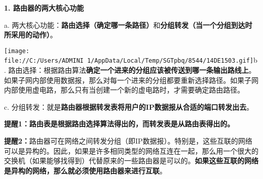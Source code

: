 {\textbf{1. 路由器的两大核心功能}}

{a.
两大核心功能：}\textbf{路由选择（确定哪一条路径）}{和}\textbf{分组转发（当一个分组到达时所采用的动作）}{。}

\texttt{[image: file://C:/Users/ADMINI~1/AppData/Local/Temp/SGTpbq/8544/14DE1503.gif]}{b.
路由}{选择：根据路由算法}\textbf{{确定一个进来的分组应该被传送到哪一条输出路线上}}{。如果子网内部使用数据报，那么对每一个进来的分组都要重新选择路径。如果子网内部使用虚电路，那么只有当创建一个新的虚电路时，才需要确定路由路径。}

c.
分组转发：就是\textbf{{路由器根据转发表将用户的IP数据报从合适的端口转发出去}}。

\textbf{{\textbf{{提醒1：}}{路由表是根据路由选择算法得出的，而转发表是从路由表得出的。}{}}}

\textbf{{\textbf{{\textbf{提醒2：}}}}}{路由器可在网络之间转发分组（即IP数据报）。特别是，这些互联的网络可以是异构的。}因此{，如果是许多相同类型的网络互连在一起，那么用一个很大的交换机（如果能够找得到）代替原来的一些路由器是可以的。\textbf{如果这些互联的网络是异构的网络，那么就必须使用路由器来进行互联}。}
